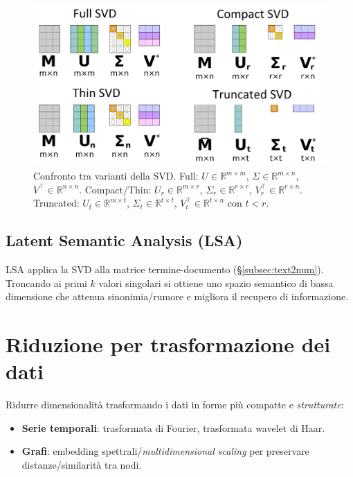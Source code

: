 \begin{figure}[htbp]
  \centering
  \includegraphics[width=\textwidth]{images/SVD.png}
  \caption{Confronto tra varianti della SVD.
  Full: $U\in\mathbb{R}^{m\times m}$, $\Sigma\in\mathbb{R}^{m\times n}$, $V^{\top}\in\mathbb{R}^{n\times n}$.
  Compact/Thin: $U_r\in\mathbb{R}^{m\times r}$, $\Sigma_r\in\mathbb{R}^{r\times r}$, $V_r^{\top}\in\mathbb{R}^{r\times n}$.
  Truncated: $U_t\in\mathbb{R}^{m\times t}$, $\Sigma_t\in\mathbb{R}^{t\times t}$, $V_t^{\top}\in\mathbb{R}^{t\times n}$ con $t<r$.}
  \label{fig:svd-variants}
\end{figure}

\subsection{Latent Semantic Analysis (LSA)}\label{subsec:lsa}
LSA applica la SVD alla matrice termine-documento (\S\ref{subsec:text2num}). Troncando ai primi $k$ valori singolari si ottiene uno spazio semantico di bassa dimensione che attenua sinonimia/rumore e migliora il recupero di informazione.

\section{Riduzione per trasformazione dei dati}\label{sec:riduzione-trasf}
Ridurre dimensionalità trasformando i dati in forme più compatte e \emph{strutturate}:
\begin{itemize}
  \item \textbf{Serie temporali}: trasformata di Fourier, trasformata wavelet di Haar.
  \item \textbf{Grafi}: embedding spettrali/\emph{multidimensional scaling} per preservare distanze/similarità tra nodi.
\end{itemize}
